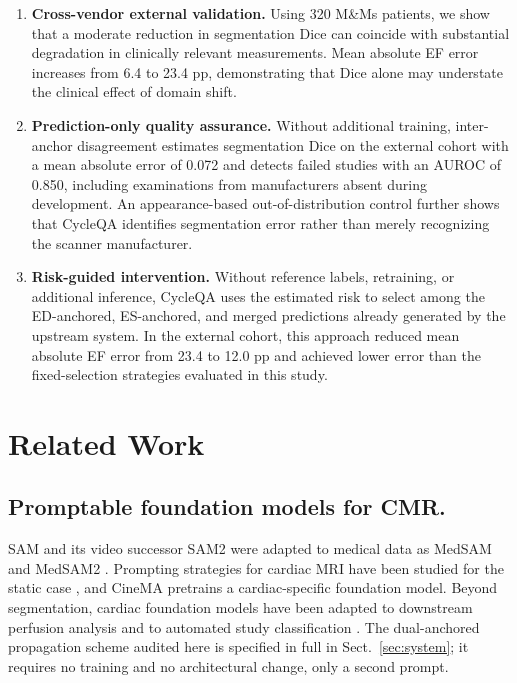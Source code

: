 \documentclass[runningheads]{llncs}
\newcommand{\CQ}{CycleQA}
\begin{document}
\begin{enumerate}
\item \textbf{Cross-vendor external validation.} Using 320 M\&Ms patients, we show that a moderate reduction in segmentation Dice can coincide with substantial degradation in clinically relevant measurements. Mean absolute EF error increases from 6.4 to 23.4 pp, demonstrating that Dice alone may understate the clinical effect of domain shift.

\item \textbf{Prediction-only quality assurance.} Without additional training, inter-anchor disagreement estimates segmentation Dice on the external cohort with a mean absolute error of 0.072 and detects failed studies with an AUROC of 0.850, including examinations from manufacturers absent during development. An appearance-based out-of-distribution control further shows that \CQ{} identifies segmentation error rather than merely recognizing the scanner manufacturer.

\item \textbf{Risk-guided intervention.} Without reference labels, retraining, or additional inference, \CQ{} uses the estimated risk to select among the ED-anchored, ES-anchored, and merged predictions already generated by the upstream system. In the external cohort, this approach reduced mean absolute EF error from 23.4 to 12.0 pp and achieved lower error than the fixed-selection strategies evaluated in this study.
\end{enumerate}


\section{Related Work}

\subsection{Promptable foundation models for CMR.}

SAM \cite{kirillov2023sam} and its video successor SAM2 \cite{ravi2024sam2} were adapted to
medical data as MedSAM \cite{ma2024medsam} and MedSAM2 \cite{zhu2024medsam2}. Prompting
strategies for cardiac MRI have been studied for the static case
\cite{stein2023samcardiac,chen2025cinecmrsam}, and CineMA \cite{fu2025cinema} pretrains a
cardiac-specific foundation model. Beyond segmentation, cardiac foundation models have been
adapted to downstream perfusion analysis \cite{shahin2026adapting} and to automated study
classification \cite{li2026classification}. The dual-anchored propagation scheme audited here
is specified in full in Sect.~\ref{sec:system}; it requires no training and no architectural
change, only a second prompt.
\vspace{-0.4cm}
\end{document}
